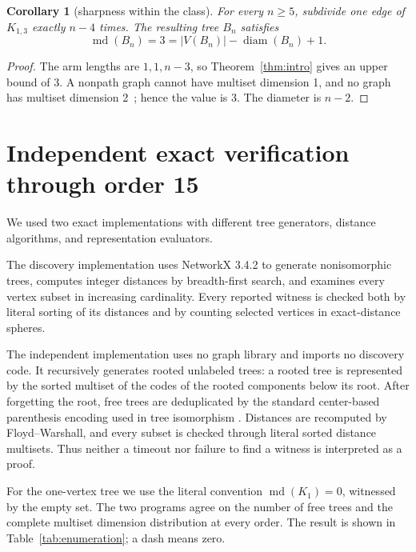 \documentclass[11pt]{amsart}
\newtheorem{corollary}[theorem]{Corollary}
\theoremstyle{definition}
\newcommand{\mdim}{\operatorname{md}}
\newcommand{\diam}{\operatorname{diam}}
\begin{document}
\begin{corollary}[sharpness within the class]\label{cor:sharp}
For every \(n\ge5\), subdivide one edge of \(K_{1,3}\) exactly \(n-4\) times.
The resulting tree \(B_n\) satisfies
\[
 \mdim(B_n)=3=|V(B_n)|-\diam(B_n)+1.
\]
\end{corollary}

\begin{proof}
The arm lengths are \(1,1,n-3\), so Theorem~\ref{thm:intro} gives an
upper bound of 3.  A nonpath graph cannot have multiset dimension 1, and no
graph has multiset dimension 2~\cite{Simanjuntak2017}; hence the value is 3.
The diameter is \(n-2\).
\end{proof}

\section{Independent exact verification through order 15}

We used two exact implementations with different tree generators, distance
algorithms, and representation evaluators.

The discovery implementation uses NetworkX 3.4.2 to generate nonisomorphic
trees, computes integer distances by breadth-first search, and examines every
vertex subset in increasing cardinality.  Every reported witness is checked
both by literal sorting of its distances and by counting selected vertices in
exact-distance spheres.

The independent implementation uses no graph library and imports no discovery
code.  It recursively generates rooted unlabeled trees: a rooted tree is
represented by the sorted multiset of the codes of the rooted components
below its root.  After forgetting the root, free trees are deduplicated by the
standard center-based parenthesis encoding used in tree isomorphism
\cite{AhoHopcroftUllman1974}.  Distances are recomputed by Floyd--Warshall,
and every subset is checked through literal sorted distance multisets.  Thus
neither a timeout nor failure to find a witness is interpreted as a proof.

For the one-vertex tree we use the literal convention
\(\mdim(K_1)=0\), witnessed by the empty set.  The two programs agree on the
number of free trees and the complete multiset dimension distribution at every
order.  The result is shown in Table~\ref{tab:enumeration}; a dash means zero.
\end{document}
